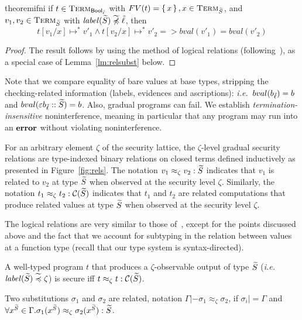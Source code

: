 \documentclass[authoryear,sort&compress,9pt,twocolumn,nocopyrightspace]{sigplanconf}
\newcommand{\Bool}{\mathsf{Bool}}
\newcommand{\oblset}[1]{\textsc{#1}}
\newcommand{\?}{\textsf{\upshape ?}} \newcommand{\consistent}[1]{\widetilde{#1}}
\newcommand{\slabel}{\mathit{label}}
\newcommand{\TermT}[1]{\oblset{Term}_{#1}}
\newcommand{\cast}[2]{\evcast{\evpr{#1}}{#2}}
\newcommand{\error}{\textup{\textbf{error}}}
\newcommand{\red}{\longmapsto}
\newcommand{\ie}{\emph{i.e.}\xspace}
\newcommand{\ev}{\varepsilon}
\newcommand{\evcast}[2]{#1#2}
\newcommand{\evpr}[1]{\braket{#1}}
\newcommand{\ncsubl}{\not \hspace{-2mm}\csubl}
\newcommand{\lobs}{\zeta}
\newcommand{\rel}{\approx_{\lobs}}
\newcommand{\rcomp}[1]{\mathcal{C}(#1)}
\newcommand{\bval}[1]{bval(#1)}
\newcommand{\subst}{\sigma}
\renewcommand{\cast}[2]{#1#2}
\begin{document}
\begin{restatable}[Noninterference]{theorem}{ifni}
\label{ifni}
if $t \in \TermT{\Bool_\clx}$ with $FV(t) =
\set{x}, x \in \TermT{\cS}$, and 
$v_1, v_2 \in \TermT{\cS}$ with $\slabel(\cS) \ncsubl \clx$, then
\begin{displaymath}
t[v_1/x] \red^{*} v'_1 \wedge t[v_2/x] \red^{*} v'_2 => \bval{v'_1} = \bval{v'_2}
\end{displaymath}
\end{restatable}
\begin{proof}
The result follows by using the method of logical relations
(following~\citet{zdancewic}), as a special case of
Lemma~\ref{lm:relsubst} below.
\end{proof}


Note that we compare equality of bare values at base types, stripping the
checking-related information (labels, evidences and
ascriptions): \ie~$\bval{b_\clx} = b$ and
$\bval{\cast{\ev}{b_\clx::\cS}} = b$. Also, gradual programs can
fail. We establish
{\em termination-insensitive} noninterference, meaning in particular
that any program
may run into an $\error$ without violating noninterference.

\begin{definition}
  For an arbitrary element $\lobs$ of the security lattice, the
  $\lobs$-level gradual security relations are type-indexed binary
  relations on closed terms defined inductively as presented in Figure~\ref{fig:rels}.
The notation $v_1 \rel v_2 : \cS$ indicates that $v_1$ is related to
$v_2$ at type $\cS$ when observed at the security level $\lobs$. Similarly, the notation $t_1 \rel t_2 : \rcomp{\cS}$
indicates that $t_1$ and $t_2$ are related computations that produce
related values at type $\cS$ when observed at the security level $\lobs$.
\end{definition}

The logical relations are very similar to those of~\citet{zdancewic},
except for the points discussed above and the fact that we account
for subtyping in the relation between values at a function type
(recall that our type system is syntax-directed).

\begin{definition}
A well-typed program $t$ that produces a $\lobs$-observable output of
type $\cS$ (\ie~$\slabel(\cS) \csubl \lobs$) is secure iff $t \rel t : \rcomp{\cS}$.
\end{definition}

\begin{definition}
Two substitutions $\subst_1$ and $\subst_2$ are related, notation
$\Gamma |- \subst_1 \rel \subst_2$, if $\subst_i |= \Gamma$ and \\
$\forall x^\cS \in \Gamma. \subst_1(x^\cS) \rel \subst_2(x^\cS) : \cS$.
\end{definition}
 
\end{document}
